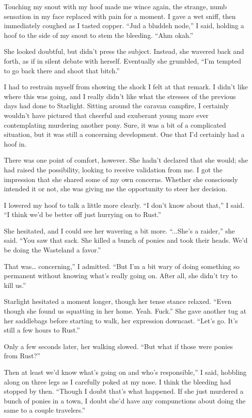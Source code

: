 Touching my snout with my hoof made me wince again, the strange, numb sensation in my face replaced with pain for a moment. I gave a wet sniff, then immediately coughed as I tasted copper. “Jud a bluddeh node,” I said, holding a hoof to the side of my snout to stem the bleeding. “Ahm okah.”

She looked doubtful, but didn’t press the subject. Instead, she wavered back and forth, as if in silent debate with herself. Eventually she grumbled, “I’m tempted to go back there and shoot that bitch.”

I had to restrain myself from showing the shock I felt at that remark. I didn’t like where this was going, and I really didn’t like what the stresses of the previous days had done to Starlight. Sitting around the caravan campfire, I certainly wouldn’t have pictured that cheerful and exuberant young mare ever contemplating murdering another pony. Sure, it was a bit of a complicated situation, but it was still a concerning development. One that I’d certainly had a hoof in.

There was one point of comfort, however. She hadn’t declared that she would; she had raised the possibility, looking to receive validation from me. I got the impression that she shared some of my own concerns. Whether she consciously intended it or not, she was giving me the opportunity to steer her decision.

I lowered my hoof to talk a little more clearly. “I don’t know about that,” I said. “I think we’d be better off just hurrying on to Rust.”

She hesitated, and I could see her wavering a bit more. “...She’s a raider,” she said. “You saw that sack. She killed a bunch of ponies and took their heads. We’d be doing the Wasteland a favor.”

\leavevmode{}That was… concerning,” I admitted. “But I’m a bit wary of doing something so permanent without knowing what’s really going on. After all, she didn’t try to kill us.”

Starlight hesitated a moment longer, though her tense stance relaxed. “Even though she found us squatting in her home. Yeah. Fuck.” She gave another tug at her saddlebags before starting to walk, her expression downcast. “Let’s go. It’s still a few hours to Rust.”

Only a few seconds later, her walking slowed. “But what if those were ponies from Rust?”

\leavevmode{}Then at least we’d know what’s going on and who’s responsible,” I said, hobbling along on three legs as I carefully poked at my nose. I think the bleeding had stopped by then. “Though I doubt that’s what happened. If she just murdered a bunch of ponies in a town, I doubt she’d have any compunctions about doing the same to a couple travelers.”


